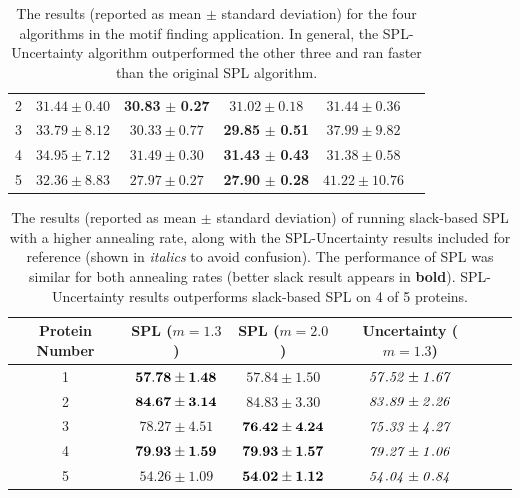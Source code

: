 \documentclass{article}
\begin{document}
\begin{table}[h]
\begin{center}
{\begin{tabular}{|c|c|c|c|c|c|}
2 & $31.44 \pm 0.40$ & \textbf{30.83} $\pm$ \textbf{0.27} & $31.02 \pm 0.18$ & $31.44 \pm 0.36$\\
3 & $33.79 \pm 8.12$ & $30.33 \pm 0.77$ & \textbf{29.85} $\pm$ \textbf{0.51} & $37.99 \pm 9.82$\\
4 & $34.95 \pm 7.12$ & $31.49 \pm 0.30$ & \textbf{31.43} $\pm$ \textbf{0.43} & $31.38 \pm 0.58$\\
5 & $32.36 \pm 8.83$ & $27.97 \pm 0.27$ & \textbf{27.90} $\pm$ \textbf{0.28} & $41.22 \pm 10.76$\\\hline
\end{tabular}
}
\end{center}
\caption{The results (reported as mean $\pm$ standard deviation) for the four algorithms in the motif finding application. In general, the SPL-Uncertainty algorithm outperformed the other three and ran faster than the original SPL algorithm. }
\label{tbl:motif}
\end{table}



\begin{table}[h]
\caption{The results (reported as mean $\pm$ standard deviation) of running slack-based SPL with a higher annealing rate, along with the SPL-Uncertainty results included for reference (shown in \emph{italics} to avoid confusion). The performance of SPL was similar for both annealing rates (better slack result appears in \textbf{bold}).  SPL-Uncertainty results outperforms slack-based SPL on 4 of 5 proteins.}
\begin{center}
\begin{tabular}{|c|c|c|c|c|c|}
\hline Protein Number  & SPL ($m=1.3$) & SPL ($m=2.0$) & Uncertainty ($m=1.3$) \\\hline
1 & ${\bf57.78 \pm 1.48}$ & $57.84 \pm 1.50$ & $\it{57.52 \pm 1.67}$ \\ \hline
2 & ${\bf84.67 \pm 3.14}$ & $84.83 \pm 3.30$ & $\it{83.89 \pm 2.26}$ \\ \hline
3 & $78.27 \pm 4.51$ & ${\bf76.42 \pm 4.24}$ & $\it{75.33 \pm 4.27}$ \\ \hline
4 & ${\bf79.93 \pm 1.59}$ & ${\bf79.93 \pm 1.57}$ & $\it{79.27 \pm 1.06}$ \\ \hline
5 & $54.26 \pm 1.09$ & ${\bf54.02 \pm 1.12}$ & $\it{54.04 \pm 0.84}$ \\ \hline
\end{tabular}
\end{center}
\label{tbl:faster}
\end{table}
\end{document}
